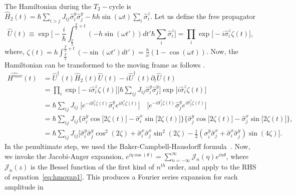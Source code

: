 \documentclass[12pt]{iopart}
\begin{document}
The Hamiltonian during the $T_2-$cycle is $\displaystyle \hat{H}_2(t) = \hbar\sum_{i>j} J_{ij}\hat{\sigma}^y_i\hat{\sigma}^y_j - \hbar h \sin(\omega t) \sum_i \hat{\sigma}^z_i$. Let us define the free propagator 
\begin{equation}
    \hat{U}(t) \equiv \exp \bigg[-\frac{i}{\hbar}\int_{\frac{T}{2}}^{\frac{T}{2}+t} (-h \sin(\omega t'))dt' \hbar\sum_i\hat{\sigma}^z_i\bigg]
    =\prod_{i} \exp\big[-i \hat{\sigma}^z_i\zeta(t)\big],
\end{equation}
where, $\displaystyle \zeta (t) = h\int_{\frac{T}{2}}^{\frac{T}{2}+t}  (-\sin(\omega t')dt') =\frac{h}{\omega}(1-\cos(\omega t))$.
Now, the Hamiltonian can be transformed to the moving frame as follows \cite{haldar_statistical_2022}.
\begin{align}
    \hat{H^{mov}}(t) &= \hat{U}^\dagger(t) \hat{H}_2(t) \hat{U}(t)- i \hat{U}^\dagger(t) \partial_t \hat{U}(t) \nonumber\\
    &= \prod_{i} \exp\big[-i\hat{\sigma}^z_i \zeta(t)\big] \big[\hbar\sum_{ij}J_{ij}\hat{\sigma}^y_i\hat{\sigma}^y_j\big] \exp\big[ i\hat{\sigma}^z_i \zeta(t)\big]\nonumber\\
    &= \hbar\sum_{ij} J_{ij}\;\big[ e^{-i\hat{\sigma}^z_i \zeta(t)} \hat{\sigma}^y_i e^{i\hat{\sigma}^z_i \zeta(t)}\big]\quad \big[e^{-i\hat{\sigma}^z_j  \zeta(t)}\hat{\sigma}^y_j e^{i\hat{\sigma}^z_j \zeta(t)}\big]\nonumber\\
    &=\hbar\sum_{ij}J_{ij}\Big\{\hat{\sigma}^y_i\cos{\big[2\zeta(t)\big]}-\hat{\sigma}^x_i\sin{\big[2\zeta(t)\big]}\Big\}\Big\{\hat{\sigma}^y_j\cos{\big[2\zeta(t)\big]}-\hat{\sigma}^x_j\sin{\big[2\zeta(t)\big]}\Big\},\nonumber\\
    &= \hbar\sum_{ij} J_{ij}  \Big[ \hat{\sigma}^y_i\hat{\sigma}^y_j\cos^2(2\zeta) +\hat{\sigma}^x_i\hat{\sigma}^x_j \sin^2(2\zeta) - \frac12 (\sigma^y_i\hat{\sigma}^x_j + \hat{\sigma}^x_i\hat{\sigma}^y_j)\sin(4\zeta)\Big].
    \label{eq:hmovap1}
\end{align}
In the penultimate step, we used the Baker-Campbell-Hausdorff formula~\cite{Magnus1954}. Now, we invoke the Jacobi-Anger expansion, $e^{i\eta \cos(\theta)} = \sum_{n=-\infty}^{\infty}\mathcal{J}_n(\eta)e^{in\theta}$, where $\mathcal{J}_n(z)$ is the Bessel function of the first kind of $n^{th}$ order, and apply to the RHS of  equation~\ref{eq:hmovap1}. This produces a Fourier series expansion for each amplitude in
\end{document}
